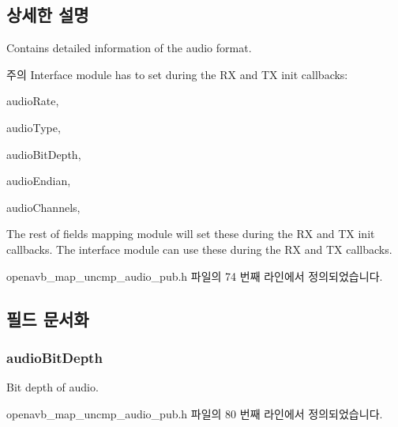 \subsection{상세한 설명}
Contains detailed information of the audio format. \begin{DoxyNote}{주의}
Interface module has to set during the RX and TX init callbacks\+:
\begin{DoxyItemize}
\item audio\+Rate,
\item audio\+Type,
\item audio\+Bit\+Depth,
\item audio\+Endian,
\item audio\+Channels, 
\end{DoxyItemize}

The rest of fields mapping module will set these during the RX and TX init callbacks. The interface module can use these during the RX and TX callbacks. 
\end{DoxyNote}


openavb\+\_\+map\+\_\+uncmp\+\_\+audio\+\_\+pub.\+h 파일의 74 번째 라인에서 정의되었습니다.



\subsection{필드 문서화}
\subsubsection[{\texorpdfstring{audio\+Bit\+Depth}{audioBitDepth}}]{ audio\+Bit\+Depth}\hypertarget{structmedia__q__pub__map__uncmp__audio__info__t_a868321a19830c5c46ed52c007dfdedb9}{}\label{structmedia__q__pub__map__uncmp__audio__info__t_a868321a19830c5c46ed52c007dfdedb9}


Bit depth of audio. 



openavb\+\_\+map\+\_\+uncmp\+\_\+audio\+\_\+pub.\+h 파일의 80 번째 라인에서 정의되었습니다.

